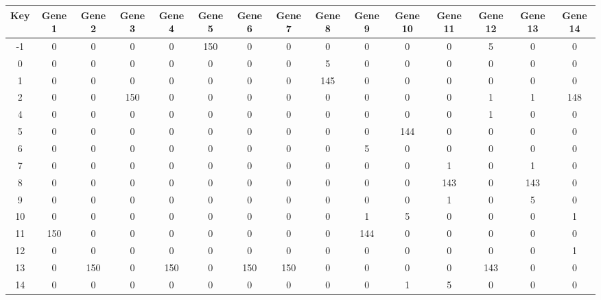\begin{tabular}{|c|c|c|c|c|c|c|c|c|c|c|c|c|c|c|}
\hline
Key & Gene 1 & Gene 2 & Gene 3 & Gene 4 & Gene 5 & Gene 6 & Gene 7 & Gene 8 & Gene 9 & Gene 10 & Gene 11 & Gene 12 & Gene 13 & Gene 14 \\
\hline
-1 & 0 & 0 & 0 & 0 & 150 & 0 & 0 & 0 & 0 & 0 & 0 & 5 & 0 & 0 \\
0 & 0 & 0 & 0 & 0 & 0 & 0 & 0 & 5 & 0 & 0 & 0 & 0 & 0 & 0 \\
1 & 0 & 0 & 0 & 0 & 0 & 0 & 0 & 145 & 0 & 0 & 0 & 0 & 0 & 0 \\
2 & 0 & 0 & 150 & 0 & 0 & 0 & 0 & 0 & 0 & 0 & 0 & 1 & 1 & 148 \\
4 & 0 & 0 & 0 & 0 & 0 & 0 & 0 & 0 & 0 & 0 & 0 & 1 & 0 & 0 \\
5 & 0 & 0 & 0 & 0 & 0 & 0 & 0 & 0 & 0 & 144 & 0 & 0 & 0 & 0 \\
6 & 0 & 0 & 0 & 0 & 0 & 0 & 0 & 0 & 5 & 0 & 0 & 0 & 0 & 0 \\
7 & 0 & 0 & 0 & 0 & 0 & 0 & 0 & 0 & 0 & 0 & 1 & 0 & 1 & 0 \\
8 & 0 & 0 & 0 & 0 & 0 & 0 & 0 & 0 & 0 & 0 & 143 & 0 & 143 & 0 \\
9 & 0 & 0 & 0 & 0 & 0 & 0 & 0 & 0 & 0 & 0 & 1 & 0 & 5 & 0 \\
10 & 0 & 0 & 0 & 0 & 0 & 0 & 0 & 0 & 1 & 5 & 0 & 0 & 0 & 1 \\
11 & 150 & 0 & 0 & 0 & 0 & 0 & 0 & 0 & 144 & 0 & 0 & 0 & 0 & 0 \\
12 & 0 & 0 & 0 & 0 & 0 & 0 & 0 & 0 & 0 & 0 & 0 & 0 & 0 & 1 \\
13 & 0 & 150 & 0 & 150 & 0 & 150 & 150 & 0 & 0 & 0 & 0 & 143 & 0 & 0 \\
14 & 0 & 0 & 0 & 0 & 0 & 0 & 0 & 0 & 0 & 1 & 5 & 0 & 0 & 0 \\
\hline
\end{tabular}